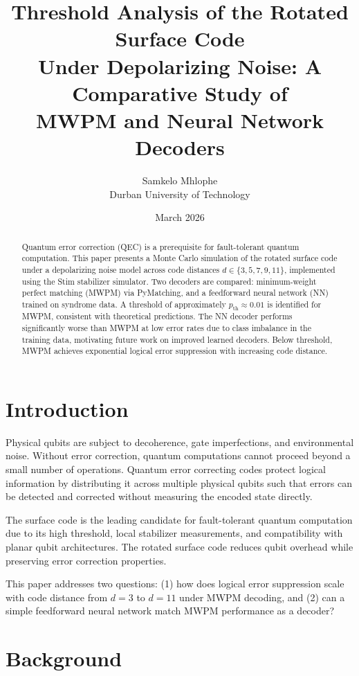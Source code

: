 \documentclass[12pt,a4paper]{article}
\title{\textbf{Threshold Analysis of the Rotated Surface Code\\
Under Depolarizing Noise: A Comparative Study of\\
MWPM and Neural Network Decoders}}
\author{Samkelo Mhlophe\\
Durban University of Technology}
\date{March 2026}
\begin{document}
\maketitle

\begin{abstract}
Quantum error correction (QEC) is a prerequisite for fault-tolerant quantum
computation. This paper presents a Monte Carlo simulation of the rotated surface
code under a depolarizing noise model across code distances $d \in \{3,5,7,9,11\}$,
implemented using the Stim stabilizer simulator. Two decoders are compared:
minimum-weight perfect matching (MWPM) via PyMatching, and a feedforward neural
network (NN) trained on syndrome data. A threshold of approximately
$p_{\text{th}} \approx 0.01$ is identified for MWPM, consistent with theoretical
predictions. The NN decoder performs significantly worse than MWPM at low error
rates due to class imbalance in the training data, motivating future work on
improved learned decoders. Below threshold, MWPM achieves exponential logical
error suppression with increasing code distance.
\end{abstract}

\section{Introduction}
Physical qubits are subject to decoherence, gate imperfections, and environmental
noise. Without error correction, quantum computations cannot proceed beyond a small
number of operations. Quantum error correcting codes protect logical information by
distributing it across multiple physical qubits such that errors can be detected and
corrected without measuring the encoded state directly.

The surface code \cite{kitaev1997} is the leading candidate for fault-tolerant
quantum computation due to its high threshold, local stabilizer measurements, and
compatibility with planar qubit architectures. The rotated surface code
\cite{fowler2012} reduces qubit overhead while preserving error correction properties.

This paper addresses two questions: (1) how does logical error suppression scale
with code distance from $d=3$ to $d=11$ under MWPM decoding, and (2) can a simple
feedforward neural network match MWPM performance as a decoder?

\section{Background}
\end{document}
